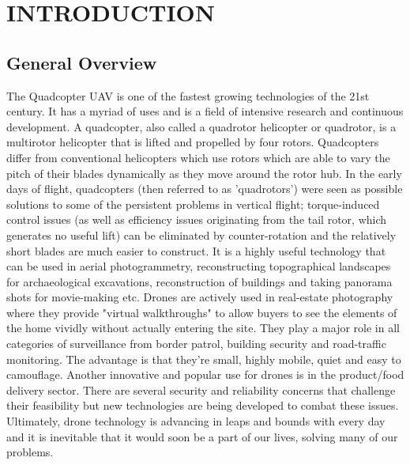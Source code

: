 
\chapter{INTRODUCTION} %
\section{General Overview} %
The Quadcopter UAV is one of the fastest growing technologies of the 21st century. It has a myriad of uses and is a field of intensive research and continuous development. 
A quadcopter, also called a quadrotor helicopter or quadrotor, is a multirotor helicopter that is lifted and propelled by four rotors\cite{wiki:quad}. Quadcopters differ from conventional helicopters which use rotors which are able to vary the pitch of their blades dynamically as they move around the rotor hub. In the early days of flight, quadcopters (then referred to as 'quadrotors') were seen as possible solutions to some of the persistent problems in vertical flight; torque-induced control issues (as well as efficiency issues originating from the tail rotor, which generates no useful lift) can be eliminated by counter-rotation and the relatively short blades are much easier to construct.
\newline
\newline
It is a highly useful technology that can be used in aerial photogrammetry, reconstructing topographical landscapes for archaeological excavations, reconstruction of buildings and taking panorama shots for movie-making etc. Drones are actively used in real-estate photography where they provide "virtual walkthroughs" to allow buyers to see the elements of the home vividly without actually entering the site. They play a major role in all categories of surveillance from border patrol, building security and road-traffic monitoring. The advantage is that they're small, highly mobile, quiet and easy to camouflage. Another innovative and popular use for drones is in the product/food delivery sector. There are several security and reliability concerns that challenge their feasibility but new technologies are being developed to combat these issues.
\newline \newline
Ultimately, drone technology is advancing in leaps and bounds with every day and it is inevitable that it would soon be a part of our lives, solving many of our problems.

